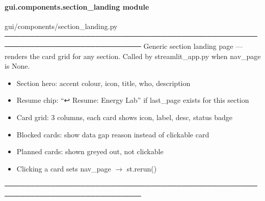 \documentclass[letterpaper,10pt,english]{sphinxmanual}
\begin{document}
\paragraph{gui.components.section\_landing module}
\label{\detokenize{gui.components.section_landing:module-gui.components.section_landing}}\label{\detokenize{gui.components.section_landing:gui-components-section-landing-module}}\label{\detokenize{gui.components.section_landing::doc}}
\sphinxAtStartPar
gui/components/section\_landing.py
─────────────────────────────────────────────────────────────────────────────
Generic section landing page — renders the card grid for any section.
Called by streamlit\_app.py when nav\_page is None.
\begin{description}
\begin{itemize}
\item {} 
\sphinxAtStartPar
Section hero: accent colour, icon, title, who, description

\item {} 
\sphinxAtStartPar
Resume chip: “↩ Resume: Energy Lab” if last\_page exists for this section

\item {} 
\sphinxAtStartPar
Card grid: 3 columns, each card shows icon, label, desc, status badge

\item {} 
\sphinxAtStartPar
Blocked cards: show data gap reason instead of clickable card

\item {} 
\sphinxAtStartPar
Planned cards: shown greyed out, not clickable

\item {} 
\sphinxAtStartPar
Clicking a card sets nav\_page \(\rightarrow\) st.rerun()

\end{itemize}

\end{description}

\sphinxAtStartPar
─────────────────────────────────────────────────────────────────────────────
\end{document}

